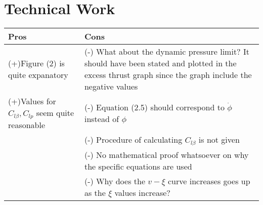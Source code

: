 \section{Technical Work}

\begin{table}[htbp]
  \centering
    \begin{tabular}{p{7cm}|p{7cm}}
    \toprule
    \textbf{Pros}  & \textbf{Cons} \\
    \midrule
    (+)Figure (2) is quite expanatory & (-) What about the dynamic pressure limit? It should have been stated and plotted in the excess thrust graph since the graph include the negative values \\
    (+)Values for $C_{l\beta},C_{lp}$ seem quite reasonable & (-) Equation (2.5) should correspond to $\dot{\phi}$ instead of $\phi$ \\
          & (-) Procedure of calculating $C_{l\beta}$ is not given \\
          & (-) No mathematical proof whatsoever on why the specific equations are used \\
          & (-) Why does the $v-\xi$ curve increases goes up as the $\xi$ values increase? \\
    \bottomrule
    \end{tabular}%
\end{table}%
